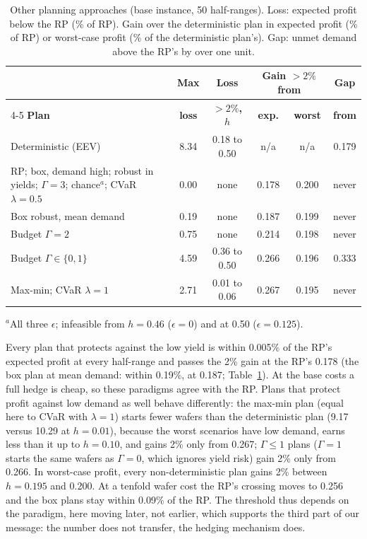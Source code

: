 \begin{table}[t]
\centering
\caption{Other planning approaches (base instance, 50 half-ranges). Loss: expected profit below the RP (\% of RP). Gain over the deterministic plan in expected profit (\% of RP) or worst-case profit (\% of the deterministic plan's). Gap: unmet demand above the RP's by over one unit.}
\label{tab:extA-paradigms}
\footnotesize
\setlength{\tabcolsep}{2pt}
\begin{tabular}{@{}p{3.05cm}ccccc@{}}
\toprule
 & \textbf{Max} & \textbf{Loss} & \multicolumn{2}{c}{\textbf{Gain $>2\%$ from}} & \textbf{Gap} \\
\cmidrule(lr){4-5}
\textbf{Plan} & \textbf{loss} & \textbf{$>2\%$, $h$} & \textbf{exp.} & \textbf{worst} & \textbf{from} \\
\midrule
Deterministic (EEV) & 8.34 & 0.18 to 0.50 & n/a & n/a & 0.179 \\
RP; box, demand high; robust in yields; $\Gamma=3$; chance$^{a}$; CVaR $\lambda=0.5$ & 0.00 & none & 0.178 & 0.200 & never \\
Box robust, mean demand & 0.19 & none & 0.187 & 0.199 & never \\
Budget $\Gamma=2$ & 0.75 & none & 0.214 & 0.198 & never \\
Budget $\Gamma\in\{0,1\}$ & 4.59 & 0.36 to 0.50 & 0.266 & 0.196 & 0.333 \\
Max-min; CVaR $\lambda=1$ & 2.71 & 0.01 to 0.06 & 0.267 & 0.195 & never \\
\bottomrule
\end{tabular}

\vspace{1pt}
{\footnotesize $^{a}$All three $\epsilon$; infeasible from $h=0.46$ ($\epsilon=0$) and at 0.50 ($\epsilon=0.125$).}
\end{table}

Every plan that protects against the low yield is within 0.005\% of the RP's expected profit at every half-range and passes the 2\% gain at the RP's 0.178 (the box plan at mean demand: within 0.19\%, at 0.187; Table~\ref{tab:extA-paradigms}). At the base costs a full hedge is cheap, so these paradigms agree with the RP. Plans that protect profit against low demand as well behave differently: the max-min plan (equal here to CVaR with $\lambda=1$) starts fewer wafers than the deterministic plan (9.17 versus 10.29 at $h=0.01$), because the worst scenarios have low demand, earns less than it up to $h=0.10$, and gains 2\% only from 0.267; $\Gamma\le1$ plans ($\Gamma=1$ starts the same wafers as $\Gamma=0$, which ignores yield risk) gain 2\% only from 0.266. In worst-case profit, every non-deterministic plan gains 2\% between $h=0.195$ and 0.200. At a tenfold wafer cost the RP's crossing moves to 0.256 and the box plans stay within 0.09\% of the RP. The threshold thus depends on the paradigm, here moving later, not earlier, which supports the third part of our message: the number does not transfer, the hedging mechanism does.

